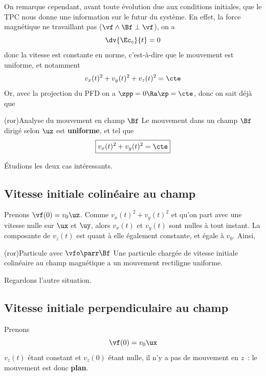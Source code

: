 \documentclass[../../main/main.tex]{subfiles}
\begin{document}
On remarque cependant, avant toute évolution due aux conditions initiales, que
le TPC nous donne une information sur le futur du système. En effet, la force
magnétique ne travaillant pas ($\vf\wedge\Bf \perp \vf$), on a
\[\dv{\Ec_c}{t} = 0\]
donc la vitesse est constante en norme, c'est-à-dire que le mouvement est
uniforme, et notamment
\[v_x(t)^2 + v_y(t)^2 + v_z(t)^2 = \cte\]
Or, avec la projection du PFD on a $\zpp = 0 \Ra \zp = \cte$, donc on sait déjà
que
\begin{tcb*}[cnt](ror){Analyse du mouvement en champ $\protect\Bf$}
	Le mouvement dans un champ $\Bf$ dirigé selon $\uz$ est \textbf{uniforme},
	et tel que
	\[\boxed{v_x(t)^2 + v_y(t)^2 = \cte}\]
\end{tcb*}
Étudions les deux cas intéressants.

\subsection{Vitesse initiale colinéaire au champ}
Prenons $\vf(0) = v_0\uz$. Comme $v_x(t)^2 + v_y(t)^2$ et qu'on part avec une
vitesse nulle sur $\ux$ et $\uy$, alors $v_x(t)$ et $v_y(t)$ sont nulles à tout
instant. La composante de $v_z(t)$ est quant à elle également constante, et
égale à $v_0$. Ainsi,
\begin{tcb*}[cnt](ror){Particule avec $\protect\vfo \parr \protect\Bf$}
	Une particule chargée de vitesse initiale colinéaire au champ magnétique a
	un mouvement rectiligne uniforme.
\end{tcb*}

Regardons l'autre situation.
\subsection{Vitesse initiale perpendiculaire au champ}
Prenons
\[\vf(0) = v_0\ux\]
$v_z(t)$ étant constant et $v_z(0)$ étant nulle, il n'y a pas de mouvement en
$z$~: le mouvement est donc \textbf{plan}.
\end{document}
